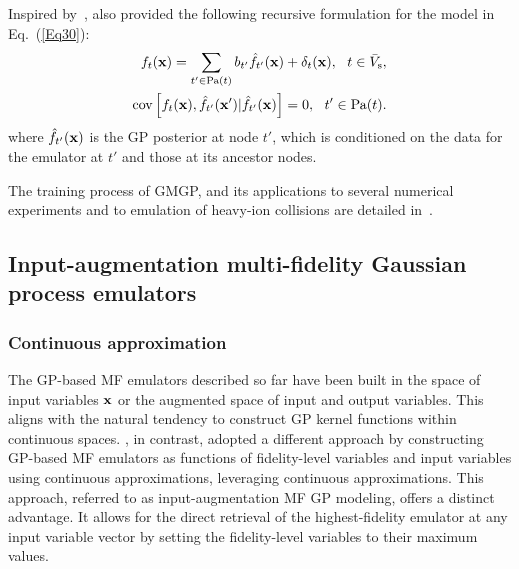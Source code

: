\documentclass[iicol,sn-basic]{sn-jnl}%
\theoremstyle{thmstyleone}%
\theoremstyle{thmstyletwo}
\theoremstyle{thmstylethree}
\begin{document}
\begin{linenumbers}
Inspired by~\cite{Gratiet2014}, \cite{Ji2021} also provided the following recursive formulation for the model in Eq.~(\ref{Eq30}):
\begin{subequations}\label{Eq33}
	\begin{align}
		f_t({\bf x}) = \sum_{t' \in \text{Pa}(t)}
		b_{t'} \hat{f}_{t'}({\bf x}) + \delta_{t}({\bf x}), \ \  t \in \bar{V}_\text{s}
		\label{Eq33-1},\\
		\text{cov}\left[f_{t}({\bf x}),\hat{f}_{t'}({\bf x}')|\hat{f}_{t'}({\bf x})\right]=0, \ \ t' \in  \text{Pa}(t)
		\label{Eq33-2}.
	\end{align}
\end{subequations}
where $\hat{f}_{t'}({\bf x})$ is the GP posterior at node $t'$, which is conditioned on the data for the emulator at $t'$ and those at its ancestor nodes.

The training process of GMGP, and its applications to several numerical experiments and to emulation of heavy-ion collisions are detailed in~\cite{Ji2021}.

\subsection{Input-augmentation multi-fidelity Gaussian process emulators}\label{Sec56}

\subsubsection{Continuous approximation}\label{Sec561}

The GP-based MF emulators described so far have been built in the space of input variables $\bf x$ or the augmented space of input and output variables.
This aligns with the natural tendency to construct GP kernel functions within continuous spaces. \cite{Kandasamy2017}, in contrast, adopted a different approach by constructing GP-based MF emulators as functions of fidelity-level variables and input variables using continuous approximations, leveraging continuous approximations.
This approach, referred to as input-augmentation MF GP modeling, offers a distinct advantage.
It allows for the direct retrieval of the highest-fidelity emulator at any input variable vector by setting the fidelity-level variables to their maximum values.
 

\end{linenumbers}
\end{document}
